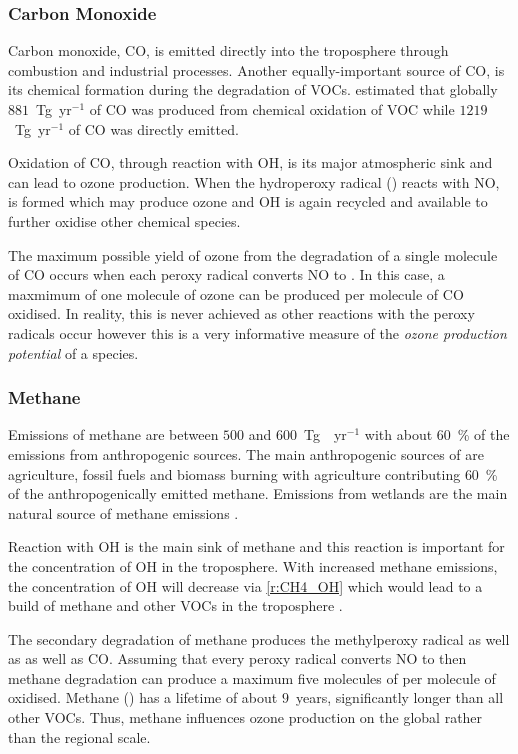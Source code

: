 \subsubsection{Carbon Monoxide}
Carbon monoxide, CO, is emitted directly into the troposphere through combustion and industrial processes.
Another equally-important source of CO, is its chemical formation during the degradation of VOCs.
\citet{Hauglustaine:1998} estimated that globally $881$~Tg~yr$^{-1}$ of CO was produced from chemical oxidation of VOC while $1219$~Tg~yr$^{-1}$ of CO was directly emitted.

Oxidation of CO, through reaction with OH, is its major atmospheric sink and can lead to ozone production.
When the hydroperoxy radical () reacts with NO,  is formed which may produce ozone and OH is again recycled and available to further oxidise other chemical species.

The maximum possible yield of ozone from the degradation of a single molecule of CO occurs when each peroxy radical converts NO to .
In this case, a maxmimum of one molecule of ozone can be produced per molecule of CO oxidised.
In reality, this is never achieved as other reactions with the peroxy radicals occur however this is a very informative measure of the \emph{ozone production potential} of a species.

\subsubsection{Methane}
Emissions of methane are between $500$ and $600$~Tg~~yr$^{-1}$ with about $60$~\% of the emissions from anthropogenic sources.
The main anthropogenic sources of  are agriculture, fossil fuels and biomass burning with agriculture contributing $60$~\% of the anthropogenically emitted methane.
Emissions from wetlands are the main natural source of methane emissions \citep{Kirschke:2013}.

Reaction with OH is the main sink of methane and this reaction is important for the concentration of OH in the troposphere.
With increased methane emissions, the concentration of OH will decrease via \eqref{r:CH4_OH} which would lead to a build of methane and other VOCs in the troposphere \citep{Holmes:2013}.

The secondary degradation of methane produces the methylperoxy radical  as well as  as well as CO.
Assuming that every peroxy radical converts NO to  then methane degradation can produce a maximum five molecules of  per molecule of  oxidised.
Methane () has a lifetime of about $9$~years, significantly longer than all other VOCs.
Thus, methane influences ozone production on the global rather than the regional scale.  

